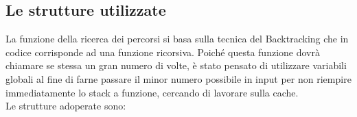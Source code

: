 \documentclass[11pt,a4paper,twocolumn]{IEEEtran}
\newcounter{algoritmo}
\begin{document}
	\subsection*{Le strutture utilizzate}
	La funzione della ricerca dei percorsi si basa
	sulla tecnica del Backtracking che in codice corrisponde ad una funzione ricorsiva. Poiché questa
	funzione dovrà chiamare se stessa un gran numero
	di volte, è stato pensato di utilizzare variabili globali al fine di farne	 passare il minor
	numero possibile in input per non
	riempire immediatamente lo stack a funzione,
	cercando di lavorare sulla cache.\medskip\\ 
	Le strutture adoperate sono:
\end{document}
